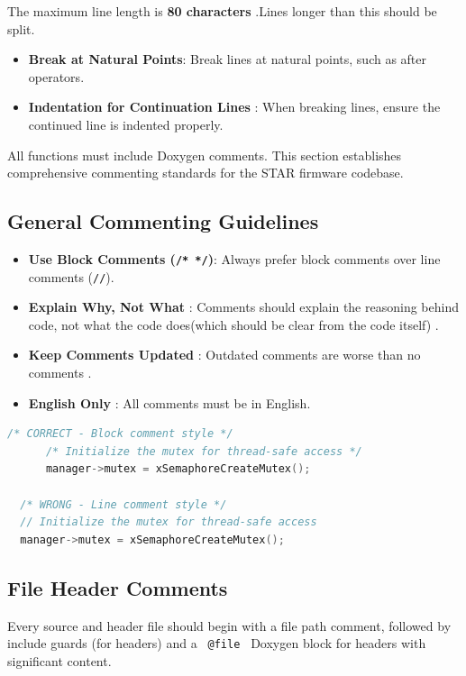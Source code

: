             The maximum line length is \textbf{80 characters}
                .Lines longer than this should be split.
\begin{itemize}
    \item \textbf{Break at Natural Points}:
Break lines at natural points, such as after operators.
    \item \textbf{Indentation for Continuation Lines
}: When breaking lines, ensure the continued line is indented properly.
\end{itemize}



All functions must include Doxygen comments. This section establishes comprehensive commenting standards for the STAR firmware codebase.

\subsection{General Commenting Guidelines
}

\begin{itemize}
    \item \textbf{Use Block Comments (\texttt{/* */})}: Always prefer block comments over line comments (\texttt{//}).
  \item \textbf{Explain Why, Not What}
      : Comments should explain the reasoning behind code,
        not what the code does(which should be clear from the code itself)
                .
    \item \textbf{Keep Comments Updated}
      : Outdated comments are worse than no comments
                .
    \item \textbf{English Only} : All comments must be in English.
\end{itemize}

  \begin{lstlisting}[language = C]
      /* CORRECT - Block comment style */
      /* Initialize the mutex for thread-safe access */
      manager->mutex = xSemaphoreCreateMutex();

  /* WRONG - Line comment style */
  // Initialize the mutex for thread-safe access
  manager->mutex = xSemaphoreCreateMutex();
  \end{lstlisting}

\subsection{File Header Comments}

Every source and header file should begin with a file path comment, followed by include guards (for headers) and a \texttt{
  @file
} Doxygen block for headers with significant content.

